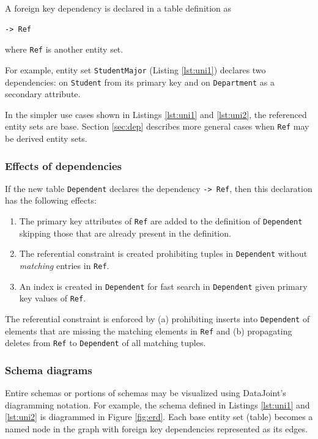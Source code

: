 \documentclass[letter,10pt]{article}
\newcommand{\datajoint}{DataJoint\xspace}
\begin{document}
A foreign key dependency is declared in a table definition as 
\begin{lstlisting}
-> Ref 
\end{lstlisting}
where \lstinline$Ref$ is another entity set.

For example, entity set \lstinline$StudentMajor$ (Listing \ref{lst:uni1}) declares two dependencies: on \lstinline$Student$ from its primary key and on \lstinline$Department$ as a secondary attribute.

In the simpler use cases shown in Listings \ref{lst:uni1} and \ref{lst:uni2}, the referenced entity sets are base. 
Section \ref{sec:dep} describes more general cases when \lstinline$Ref$ may be derived entity sets.

\subsubsection{Effects of dependencies}\label{sec:effects}
If the new table \lstinline$Dependent$ declares the dependency \lstinline$-> Ref$, then this declaration has the following effects: 
\begin{enumerate}
\item The primary key attributes of \lstinline$Ref$ are added to the definition of \lstinline$Dependent$ skipping those that are already present in the definition.
\item The referential constraint is created prohibiting tuples in \lstinline$Dependent$ without \emph{matching} entries in \lstinline$Ref$.
\item An index is created in \lstinline$Dependent$ for fast search in \lstinline$Dependent$ given primary key values of \lstinline$Ref$.
\end{enumerate}

The referential constraint is enforced by (a) prohibiting inserts into \lstinline$Dependent$ of elements that are missing the matching elements in \lstinline$Ref$ and (b) propagating deletes from \lstinline$Ref$ to \lstinline$Dependent$ of all matching tuples.

\subsubsection{Schema diagrams}\label{sec:diag}
Entire schemas or portions of schemas may be visualized using \datajoint's diagramming notation.  
For example, the schema defined in Listings \ref{lst:uni1} and \ref{lst:uni2} is diagrammed in Figure \ref{fig:erd}. 
Each base entity set (table) becomes a named node in the graph with foreign key dependencies represented as its edges. 
\end{document}
